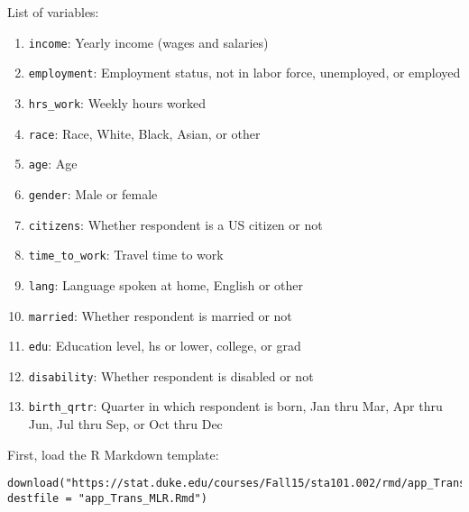 \documentclass[11pt]{article}
\begin{document}
List of variables:
\begin{enumerate}
\item \texttt{income}: Yearly income (wages and salaries)
\item \texttt{employment}: Employment status, not in labor force, unemployed, or employed
\item \texttt{hrs\_work}: Weekly hours worked
\item \texttt{race}: Race, White, Black, Asian, or other
\item \texttt{age}: Age
\item \texttt{gender}: Male or female
\item \texttt{citizens}: Whether respondent is a US citizen or not
\item \texttt{time\_to\_work}: Travel time to work
\item \texttt{lang}: Language spoken at home, English or other
\item \texttt{married}: Whether respondent is married or not
\item \texttt{edu}: Education level, hs or lower, college, or grad
\item \texttt{disability}: Whether respondent is disabled or not
\item \texttt{birth\_qrtr}: Quarter in which respondent is born, Jan thru Mar, Apr thru Jun, Jul thru Sep, or Oct thru Dec 
\end{enumerate}

First, load the R Markdown template:

{\footnotesize
\begin{Verbatim}[frame=single, formatcom=\color{blue}]
download("https://stat.duke.edu/courses/Fall15/sta101.002/rmd/app_Trans_MLR.Rmd", destfile = "app_Trans_MLR.Rmd")
\end{Verbatim}
}

%

\pagebreak
\end{document}
